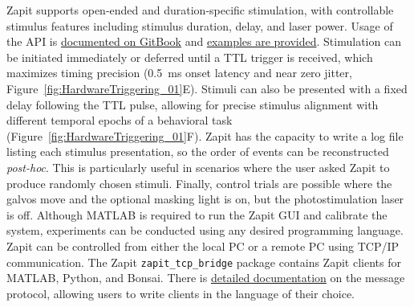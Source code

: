 Zapit supports open-ended and duration-specific stimulation, with controllable stimulus features including stimulus duration, delay, and laser power.
Usage of the API is \href{https://zapit.swcmicroscopy.com/running-experiments/matlab/running-an-experiment-in-matlab}{documented on GitBook} and \href{https://github.com/Zapit-Optostim/zapit/tree/main/examples}{examples are provided}.
Stimulation can be initiated immediately or deferred until a TTL trigger is received, which maximizes timing precision (0.5~ms onset latency and near zero jitter, Figure~\ref{fig:HardwareTriggering_01}E).
Stimuli can also be presented with a fixed delay following the TTL pulse, allowing for precise stimulus alignment with different temporal epochs of a behavioral task (Figure~\ref{fig:HardwareTriggering_01}F).
Zapit has the capacity to write a log file listing each stimulus presentation, so the order of events can be reconstructed \textit{post-hoc}.
This is particularly useful in scenarios where the user asked Zapit to produce randomly chosen stimuli.
Finally, control trials are possible where the galvos move and the optional masking light is on, but the photostimulation laser is off.
Although MATLAB is required to run the Zapit GUI and calibrate the system, experiments can be conducted using any desired programming language.
Zapit can be controlled from either the local PC or a remote PC using TCP/IP communication.
The Zapit \texttt{zapit\_tcp\_bridge} package contains Zapit clients for MATLAB, Python, and Bonsai.
There is \href{https://github.com/Zapit-Optostim/zapit-tcp-bridge/blob/main/Message_Protocol.md}{detailed documentation} on the message protocol, allowing users to write clients in the language of their choice.
